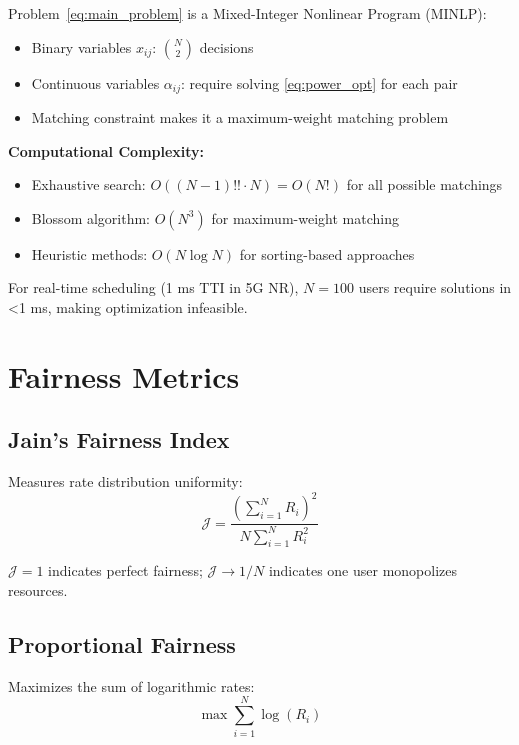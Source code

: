 Problem~\eqref{eq:main_problem} is a Mixed-Integer Nonlinear Program (MINLP):
\begin{itemize}
    \item Binary variables $x_{ij}$: $\binom{N}{2}$ decisions
    \item Continuous variables $\alpha_{ij}$: require solving \eqref{eq:power_opt} for each pair
    \item Matching constraint makes it a maximum-weight matching problem
\end{itemize}

\textbf{Computational Complexity:}
\begin{itemize}
    \item Exhaustive search: $O((N-1)!! \cdot N) = O(N!)$ for all possible matchings
    \item Blossom algorithm: $O(N^3)$ for maximum-weight matching
    \item Heuristic methods: $O(N \log N)$ for sorting-based approaches
\end{itemize}

For real-time scheduling (1 ms TTI in 5G NR), $N=100$ users require solutions in <1 ms, making optimization infeasible.

\section{Fairness Metrics}

\subsection{Jain's Fairness Index}

Measures rate distribution uniformity:
\begin{equation}
\mathcal{J} = \frac{\left(\sum_{i=1}^{N} R_i\right)^2}{N \sum_{i=1}^{N} R_i^2}
\label{eq:jains_index}
\end{equation}

$\mathcal{J} = 1$ indicates perfect fairness; $\mathcal{J} \to 1/N$ indicates one user monopolizes resources.

\subsection{Proportional Fairness}

Maximizes the sum of logarithmic rates:
\begin{equation}
\max \sum_{i=1}^{N} \log(R_i)
\end{equation}

